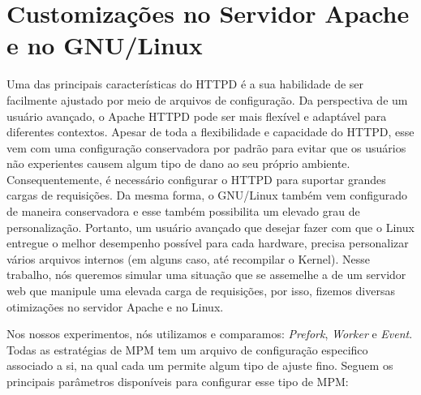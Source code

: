 \section{Customizações no Servidor Apache e no GNU/Linux}
\label{sec:customization}

Uma das principais características do HTTPD é a sua habilidade de ser
facilmente ajustado por meio de arquivos de configuração. Da perspectiva de um
usuário avançado, o Apache HTTPD pode ser mais flexível e adaptável para
diferentes contextos. Apesar de toda a flexibilidade e capacidade do HTTPD,
esse vem com uma configuração conservadora por padrão para evitar que os
usuários não experientes causem algum tipo de dano ao seu próprio ambiente.
Consequentemente, é necessário configurar o HTTPD para suportar grandes cargas
de requisições. Da mesma forma, o GNU/Linux também vem configurado de maneira
conservadora e esse também possibilita um elevado grau de personalização.
Portanto, um usuário avançado que desejar fazer com que o Linux entregue o
melhor desempenho possível para cada hardware, precisa personalizar vários
arquivos internos (em alguns caso, até recompilar o Kernel). Nesse trabalho,
nós queremos simular uma situação que se assemelhe a de um servidor web que
manipule uma elevada carga de requisições, por isso, fizemos diversas
otimizações no servidor Apache e no Linux.

Nos nossos experimentos, nós utilizamos e comparamos: \emph{Prefork},
\emph{Worker} e \emph{Event}. Todas as estratégias de MPM tem um arquivo de
configuração especifico associado a si, na qual cada um permite algum tipo de
ajuste fino. Seguem os principais parâmetros disponíveis para configurar esse
tipo de MPM:

